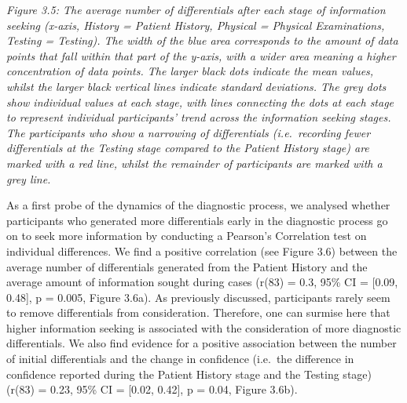 \documentclass[a4paper, nobind]{templates/ociamthesis}
\begin{document}
\emph{Figure 3.5: The average number of differentials after each stage of information seeking (x-axis, History = Patient History, Physical = Physical Examinations, Testing = Testing). The width of the blue area corresponds to the amount of data points that fall within that part of the y-axis, with a wider area meaning a higher concentration of data points. The larger black dots indicate the mean values, whilst the larger black vertical lines indicate standard deviations. The grey dots show individual values at each stage, with lines connecting the dots at each stage to represent individual participants' trend across the information seeking stages. The participants who show a narrowing of differentials (i.e.~recording fewer differentials at the Testing stage compared to the Patient History stage) are marked with a red line, whilst the remainder of participants are marked with a grey line.}

As a first probe of the dynamics of the diagnostic process, we analysed whether participants who generated more differentials early in the diagnostic process go on to seek more information by conducting a Pearson's Correlation test on individual differences. We find a positive correlation (see Figure 3.6) between the average number of differentials generated from the Patient History and the average amount of information sought during cases (r(83) = 0.3, 95\% CI = {[}0.09, 0.48{]}, p = 0.005, Figure 3.6a). As previously discussed, participants rarely seem to remove differentials from consideration. Therefore, one can surmise here that higher information seeking is associated with the consideration of more diagnostic differentials. We also find evidence for a positive association between the number of initial differentials and the change in confidence (i.e.~the difference in confidence reported during the Patient History stage and the Testing stage) (r(83) = 0.23, 95\% CI = {[}0.02, 0.42{]}, p = 0.04, Figure 3.6b).
\end{document}
